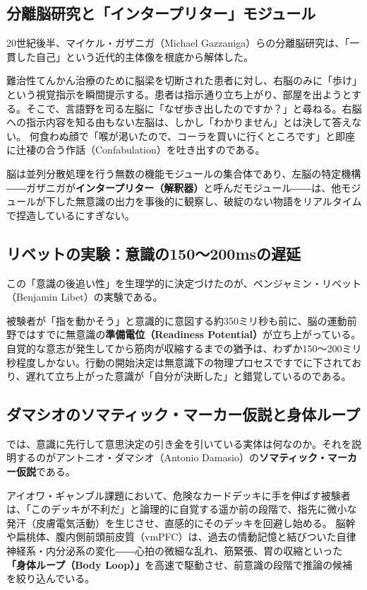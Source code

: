 \subsection{分離脳研究と「インタープリター」モジュール}
20世紀後半、マイケル・ガザニガ（Michael Gazzaniga）らの分離脳研究は、「一貫した自己」という近代的主体像を根底から解体した。

難治性てんかん治療のために脳梁を切断された患者に対し、右脳のみに「歩け」という視覚指示を瞬間提示する。患者は指示通り立ち上がり、部屋を出ようとする。そこで、言語野を司る左脳に「なぜ歩き出したのですか？」と尋ねる。右脳への指示内容を知る由もない左脳は、しかし「わかりません」とは決して答えない。
何食わぬ顔で「喉が渇いたので、コーラを買いに行くところです」と即座に辻褄の合う作話（Confabulation）を吐き出すのである。

脳は並列分散処理を行う無数の機能モジュールの集合体であり、左脳の特定機構――ガザニガが\textbf{インタープリター（解釈器）}と呼んだモジュール――は、他モジュールが下した無意識の出力を事後的に観察し、破綻のない物語をリアルタイムで捏造しているにすぎない。

\subsection{リベットの実験：意識の150〜200msの遅延}
この「意識の後追い性」を生理学的に決定づけたのが、ベンジャミン・リベット（Benjamin Libet）の実験である。

被験者が「指を動かそう」と意識的に意図する約350ミリ秒も前に、脳の運動前野ではすでに無意識の\textbf{準備電位（Readiness Potential）}が立ち上がっている。自覚的な意志が発生してから筋肉が収縮するまでの猶予は、わずか150〜200ミリ秒程度しかない。行動の開始決定は無意識下の物理プロセスですでに下されており、遅れて立ち上がった意識が「自分が決断した」と錯覚しているのである。

\subsection{ダマシオのソマティック・マーカー仮説と身体ループ}
では、意識に先行して意思決定の引き金を引いている実体は何なのか。それを説明するのがアントニオ・ダマシオ（Antonio Damasio）の\textbf{ソマティック・マーカー仮説}である。

アイオワ・ギャンブル課題において、危険なカードデッキに手を伸ばす被験者は、「このデッキが不利だ」と論理的に自覚する遥か前の段階で、指先に微小な発汗（皮膚電気活動）を生じさせ、直感的にそのデッキを回避し始める。
脳幹や扁桃体、腹内側前頭前皮質（vmPFC）は、過去の情動記憶と結びついた自律神経系・内分泌系の変化――心拍の微細な乱れ、筋緊張、胃の収縮といった\textbf{「身体ループ（Body Loop）」}を高速で駆動させ、前意識の段階で推論の候補を絞り込んでいる。

